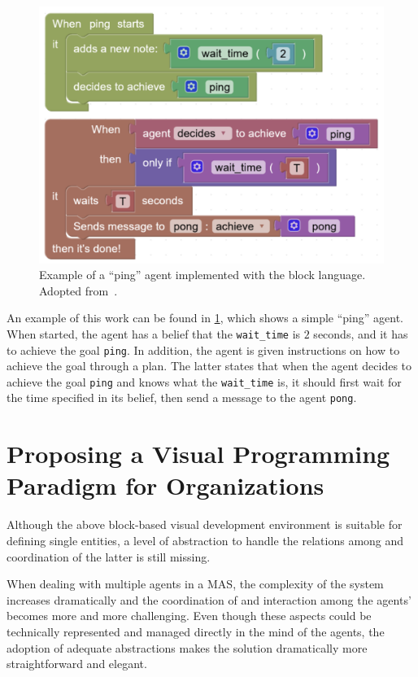 \begin{figure}[H]
    \centering
    \includegraphics[width=0.9\linewidth]{images/blocks-example.png}
    \caption{Example of a ``ping'' agent implemented with the block language. Adopted from~\cite{burattini2022agent}.}
    \label{fig:blocks-example}
\end{figure}

An example of this work can be found in \cref{fig:blocks-example}, which shows a simple ``ping'' agent.
When started, the agent has a belief that the \texttt{wait\_time} is $2$ seconds, and it has to achieve the goal \texttt{ping}.
In addition, the agent is given instructions on how to achieve the goal through a plan.
The latter states that when the agent decides to achieve the goal \texttt{ping} and knows what the \texttt{wait\_time} is, it should first wait for the time specified in its belief, then send a message to the agent \texttt{pong}.

\section{Proposing a Visual Programming Paradigm for Organizations}
Although the above block-based visual development environment is suitable for defining single entities, a level of abstraction to handle the relations among and coordination of the latter is still missing.

When dealing with multiple agents in a MAS, the complexity of the system increases dramatically and the coordination of and interaction among the agents' becomes more and more challenging.
Even though these aspects could be technically represented and managed directly in the mind of the agents, the adoption of adequate abstractions makes the solution dramatically more straightforward and elegant. \cite{boissier2020multi}

